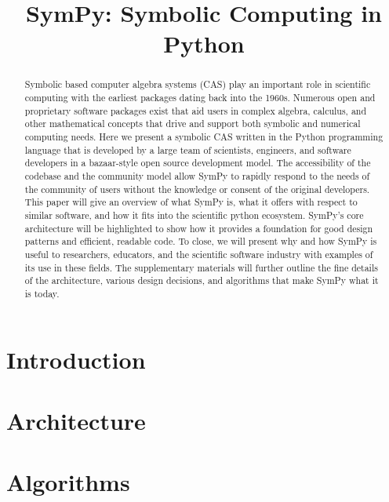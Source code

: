 \documentclass[review]{siamart0216}
\title{SymPy: Symbolic Computing in Python}
\begin{document}
\maketitle

\begin{abstract}
  Symbolic based computer algebra systems (CAS) play an important role in
  scientific computing with the earliest packages dating back into the 1960s.
  Numerous open and proprietary software packages exist that aid users in
  complex algebra, calculus, and other mathematical concepts that drive and
  support both symbolic and numerical computing needs.
  Here we present a symbolic CAS written in the Python programming language
  that is developed by a large team of scientists, engineers, and software
  developers in a bazaar-style open source development model.
  The accessibility of the codebase and the community model allow SymPy to
  rapidly respond to the needs of the community of users without the knowledge
  or consent of the original developers.
  This paper will give an overview of what SymPy is, what it offers with
  respect to similar software, and how it fits into the scientific python
  ecosystem.
  SymPy's core architecture will be highlighted to show how it provides a
  foundation for good design patterns and efficient, readable code.
  To close, we will present why and how SymPy is useful to researchers,
  educators, and the scientific software industry with examples of its use in
  these fields.
  The supplementary materials will further outline the fine details of the
  architecture, various design decisions, and algorithms that make
  SymPy what it is today.
\end{abstract}

\section{Introduction}




\section{Architecture}



\section{Algorithms}
\end{document}
